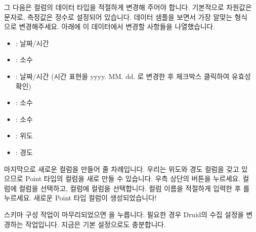 \documentclass[letterpaper,10pt,english]{sphinxmanual}
\begin{document}
그 다음은 컬럼의 데이터 타입을 적절하게 변경해 주어야 합니다. 기본적으로 차원값은 문자로, 측정값은 정수로 설정되어 있습니다. 데이터 샘플을 보면서 가장 알맞는 형식으로 변경해주세요. 아래에 이 데이터에서 변경할 사항들을 나열했습니다.
\begin{itemize}
\item {} 
 : 날짜/시간

\item {} 
 : 소수

\item {} 
 : 날짜/시간 (시간 표현을 yyyy. MM. dd. 로 변경한 후 체크박스 클릭하여 유효성 확인)

\item {} 
 : 소수

\item {} 
 : 소수

\item {} 
 : 위도

\item {} 
 : 경도

\end{itemize}

마지막으로 새로운 컬럼을 만들어 줄 차례입니다. 우리는 위도와 경도 컬럼을 갖고 있으므로 Point 타입의 컬럼을 새로 만들 수 있습니다. 우측 상단의  버튼을 누르세요.  컬럼에  컬럼을 선택하고,  컬럼에  컬럼을 선택합니다. 컬럼 이름을 적절하게 입력한 후 를 누르세요. 새로운 Point 타입 컬럼이 생성되었습니다!
\begin{quote}

\begin{figure}[H]
\centering

\noindent{}
\end{figure}
\end{quote}

스키마 구성 작업이 마무리되었으면 을 누릅니다. 필요한 경우 Druid의 수집 설정을 변경하는 작업입니다. 지금은 기본 설정으로도 충분합니다.
\begin{quote}

\begin{figure}[H]
\centering

\noindent{}
\end{figure}
\end{quote}
\end{document}
